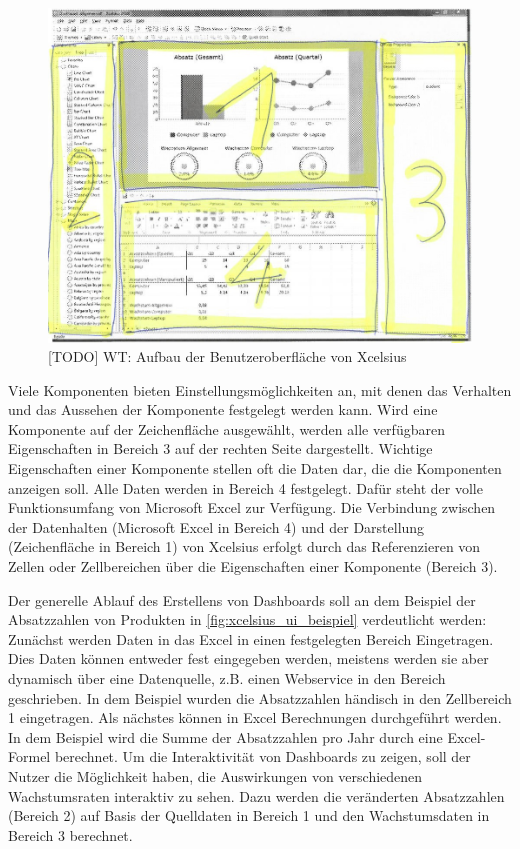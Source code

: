 \begin{figure}[h]
\centering
\setlength{\unitlength}{1mm}
\includegraphics[width=15cm]{images/Xcelsius_UI_Aufbau.jpg}
\caption{[TODO] WT: Aufbau der Benutzeroberfläche von Xcelsius\label{fig:xcelsius_ui_aufbau}}
\end{figure}

Viele Komponenten bieten Einstellungsmöglichkeiten an, mit denen das Verhalten und das Aussehen der Komponente festgelegt werden kann. Wird eine Komponente auf der Zeichenfläche ausgewählt, werden alle verfügbaren Eigenschaften in Bereich 3 auf der rechten Seite dargestellt. Wichtige Eigenschaften einer Komponente stellen oft die Daten dar, die die Komponenten anzeigen soll. Alle Daten werden in Bereich 4 festgelegt. Dafür steht der volle Funktionsumfang von Microsoft Excel zur Verfügung. Die Verbindung zwischen der Datenhalten (Microsoft Excel in Bereich 4) und der Darstellung (Zeichenfläche in Bereich 1) von Xcelsius erfolgt durch das Referenzieren von Zellen oder Zellbereichen über die Eigenschaften einer Komponente (Bereich 3).

Der generelle Ablauf des Erstellens von Dashboards soll an dem Beispiel der Absatzzahlen von Produkten in \vref{fig:xcelsius_ui_beispiel} verdeutlicht werden: Zunächst werden Daten in das Excel in einen festgelegten Bereich Eingetragen. Dies Daten können entweder fest eingegeben werden, meistens werden sie aber dynamisch über eine Datenquelle, z.B. einen Webservice in den Bereich geschrieben. In dem Beispiel wurden die Absatzzahlen händisch in den Zellbereich 1 eingetragen. Als nächstes können in Excel Berechnungen durchgeführt werden. In dem Beispiel wird die Summe der Absatzzahlen pro Jahr durch eine Excel-Formel berechnet. Um die Interaktivität von Dashboards zu zeigen, soll der Nutzer die Möglichkeit haben, die Auswirkungen von verschiedenen Wachstumsraten interaktiv zu sehen. Dazu werden die veränderten Absatzzahlen (Bereich 2) auf Basis der Quelldaten in Bereich 1 und den Wachstumsdaten in Bereich 3 berechnet.

